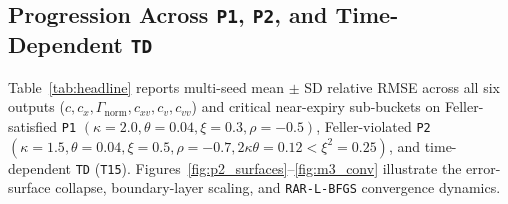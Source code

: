 \documentclass[11pt,a4paper]{article}
\begin{document}
\subsection{Progression Across \texttt{P1}, \texttt{P2}, and Time-Dependent \texttt{TD}}

Table~\ref{tab:headline} reports multi-seed mean $\pm$ SD relative RMSE across all six outputs ($c, c_x, \Gamma_{\mathrm{norm}}, c_{xv}, c_v, c_{vv}$) and critical near-expiry sub-buckets on Feller-satisfied \texttt{P1} $(\kappa=2.0,\theta=0.04,\xi=0.3,\rho=-0.5)$, Feller-violated \texttt{P2} $(\kappa=1.5,\theta=0.04,\xi=0.5,\rho=-0.7, 2\kappa\theta=0.12 < \xi^2=0.25)$, and time-dependent \texttt{TD} (\texttt{T15}). Figures~\ref{fig:p2_surfaces}--\ref{fig:m3_conv} illustrate the error-surface collapse, boundary-layer scaling, and \texttt{RAR-L-BFGS} convergence dynamics.
\end{document}
